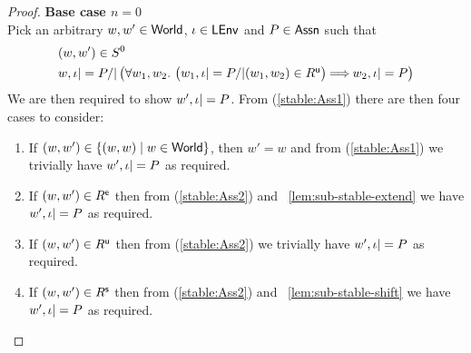 \begin{lemma}[Stability]
\begin{proof}
\noindent\textbf{Base case $n = 0$}\\
Pick an arbitrary $w, w' \in \textsf{World}$, $\iota \in \textsf{LEnv}$ and $P \in \textsf{Assn}$ such that
%
\begin{align}
	& (w, w') \in S^{0} \label{stable:Ass1}\\
	& w, \lenv |= P /| 
		\left(
		\begin{array}{@{} l @{}}
			\for{w_1, w_2} 
			\left(
			\begin{array}{@{} l @{}}
				w_1, \lenv |= P /|
			 (w_1, w_2) \in \updateR  
			\end{array}
			\right)
			\!\!\implies \!\!
			w_2, \lenv |= P 
		\end{array}
		\right) \label{stable:Ass2}
\end{align}
%
We are then required to show $w', \iota |= P$. From (\ref{stable:Ass1}) there are then four cases to consider:
\begin{enumerate}
	\item If $(w, w') \in \left\{(w, w) \mid w \in \textsf{World} \right\}$, then $w' = w$ and from (\ref{stable:Ass1}) we trivially have $w', \iota |= P$ as required.
	
	\item If $(w, w') \in R^{\textsf{e}}$ then from (\ref{stable:Ass2}) and \lem~\ref{lem:sub-stable-extend} we have $w', \iota |= P$ as required. 
	
	\item If $(w, w') \in R^{\textsf{u}}$ then from (\ref{stable:Ass2}) we trivially have $w', \iota |= P$ as required. 
	
	\item If $(w, w') \in R^{\textsf{s}}$ then from (\ref{stable:Ass2}) and \lem~\ref{lem:sub-stable-shift} we have $w', \iota |= P$ as required. 
\end{enumerate}
%


\end{proof}
\end{lemma}
